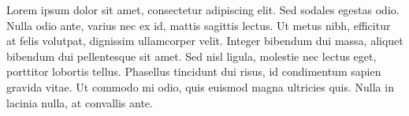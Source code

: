 \documentclass{article}
\begin{document}
\beginnumbering
\pstart
Lorem ipsum dolor sit amet, consectetur adipiscing elit. Sed sodales egestas odio. Nulla odio ante, varius nec ex id, mattis sagittis lectus. Ut metus nibh, efficitur at felis volutpat, dignissim ullamcorper velit. Integer bibendum dui massa, aliquet bibendum dui pellentesque sit amet. Sed nisl ligula, molestie nec lectus eget, porttitor lobortis tellus. Phasellus tincidunt dui risus, id condimentum sapien gravida vitae. Ut commodo mi odio, quis euismod magna ultricies quis. Nulla in lacinia nulla, at convallis ante.
\pend
\endnumbering

\end{document}
